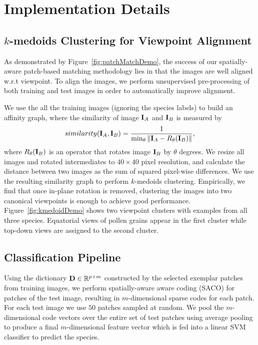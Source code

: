 \documentclass[10pt,twocolumn,letterpaper]{article}
\def\D{{\bf D}}
\def\I{{\bf I}}
\def\RB{{\mathbb R}}
\begin{document}
\section{Implementation Details}

\subsection{$k$-medoids Clustering for Viewpoint Alignment}
As demonstrated by Figure~\ref{fig:patchMatchDemo},
the success of our spatially-aware patch-based matching methodology lies in that the images are well aligned w.r.t viewpoint.
To align the images,
we perform unsupervised pre-processing of both training and test images in order to
automatically improve alignment.

We use the all the training images (ignoring the species labels) to build an
affinity graph, where the similarity of image $\I_A$ and $\I_B$ is measured by
\begin{equation}
similarity(\I_A,\I_B) =  \frac{1}{\min_\theta \Vert \I_A - R_\theta(\I_B)\Vert},
\end{equation}
where $R_\theta(\I_B)$ is an operator that rotates image $\I_B$ by $\theta$ degrees.
We resize all images and rotated intermediates to $40\times40$ pixel resolution,
and calculate the distance between two images as the sum of squared pixel-wise differences.
We use the resulting similarity graph to perform $k$-medoids clustering.
Empirically, we find that once in-plane rotation is removed, clustering the
images into two canonical viewpoints is enough to achieve good performance.
Figure~\ref{fig:kmedoidDemo} shows two viewpoint clusters with examples from
all three species. Equatorial views of pollen grains appear in the first
cluster while top-down views are assigned to the second cluster.

\subsection{Classification Pipeline}
Using the dictionary $\D \in \RB^{p\times m}$ constructed by the selected
exemplar patches from training images, we perform spatially-aware aware coding
(SACO) for patches of the test image, resulting in $m$-dimensional sparse codes
for each patch.  For each test image we use $50$ patches sampled at random.  We
pool the $m$-dimensional code vectors over the entire set of test patches using
average pooling to produce a final $m$-dimensional feature vector which is fed
into a linear SVM classifier to predict the species.
\end{document}
